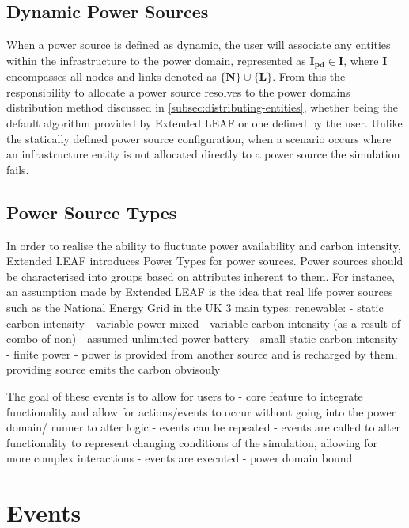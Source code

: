 \documentclass{l4proj}
\begin{document}
\subsection{Dynamic Power Sources}\label{imp:subsec:dynamic-power-sources}
When a power source is defined as dynamic, the user will associate any entities within the infrastructure to the power domain, represented as $\mathbf{I_{pd} \in I}$, where $\mathbf{I}$ encompasses all nodes and links denoted as $\mathbf{\{N\} \cup \{L\}}$.
From this the responsibility to allocate a power source resolves to the power domains distribution method discussed in \ref{subsec:distributing-entities}, whether being the default algorithm provided by Extended LEAF or one defined by the user.
Unlike the statically defined power source configuration, when a scenario occurs where an infrastructure entity is not allocated directly to a power source the simulation fails.\\

\subsection{Power Source Types}\label{imp:subsec:power-source-types}
In order to realise the ability to fluctuate power availability and carbon intensity, Extended LEAF introduces Power Types for power sources.
Power sources should be characterised into groups based on attributes inherent to them.
For instance, an assumption made by Extended LEAF is the idea that real life power sources such as the National Energy Grid in the UK
3 main types:
renewable:
    - static carbon intensity
    - variable power
mixed
    - variable carbon intensity (as a result of combo of non)
    - assumed unlimited power
battery
    - small static carbon intensity
    - finite power
    - power is provided from another source and is recharged by them, providing source emits the carbon obvisouly

The goal of these events is to allow for users to
- core feature to integrate functionality and allow for actions/events to occur without going into the power domain/ runner to alter logic
- events can be repeated
- events are called to alter functionality to represent changing conditions of the simulation, allowing for more complex interactions
- events are executed
- power domain bound
\section{Events}\label{imp:sec:envts}
\end{document}
